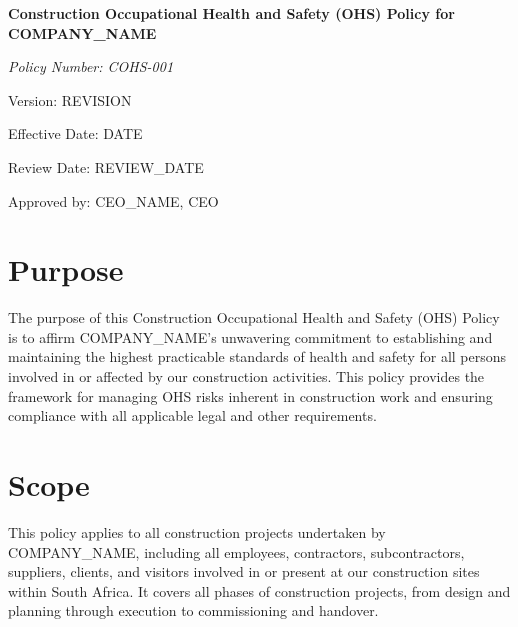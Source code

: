 \documentclass[12pt]{article}
\begin{document}
\begin{titlepage}
    \centering
    \vspace*{2cm}
    {\LARGE\bfseries Construction Occupational Health and Safety (OHS) Policy for {{COMPANY_NAME}}\par}
    \vspace{1cm}
    {\large\itshape Policy Number: COHS-001\par}
    \vspace{0.5cm}
    {\normalsize Version: {{REVISION}}\par}
    \vspace{0.5cm}
    {\normalsize Effective Date: {{DATE}}\par}
    \vspace{0.5cm}
    {\normalsize Review Date: {{REVIEW_DATE}}\par}
    \vspace{2cm}
    {\normalsize Approved by: {{CEO_NAME}}, CEO\par}
\end{titlepage}

\section{Purpose}
The purpose of this Construction Occupational Health and Safety (OHS) Policy is to affirm {{COMPANY_NAME}}'s unwavering commitment to establishing and maintaining the highest practicable standards of health and safety for all persons involved in or affected by our construction activities. This policy provides the framework for managing OHS risks inherent in construction work and ensuring compliance with all applicable legal and other requirements.

\section{Scope}
This policy applies to all construction projects undertaken by {{COMPANY_NAME}}, including all employees, contractors, subcontractors, suppliers, clients, and visitors involved in or present at our construction sites within South Africa. It covers all phases of construction projects, from design and planning through execution to commissioning and handover.
\end{document}

